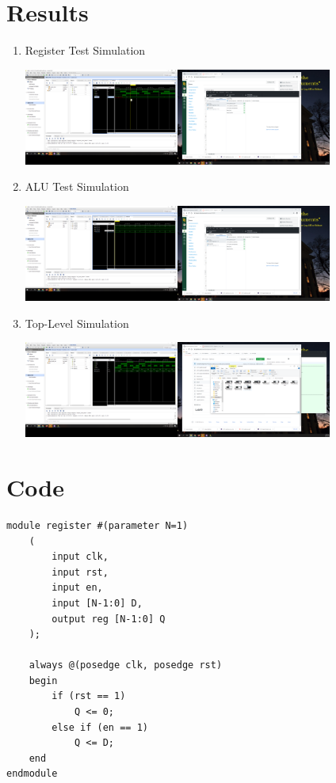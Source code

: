 \documentclass[11pt]{article}
\begin{document}
\section*{Results}
\begin{enumerate}
	
\item Register Test Simulation

\includegraphics[width=0.8\textwidth, trim= 28.5cm 16cm 68cm 5.5cm, clip]{register_test.PNG}
\label{fig:Register Test Simulation}

\item ALU Test Simulation 

\includegraphics[width=0.8\textwidth, trim= 28.5cm 16cm 68cm 5.5cm, clip]{alu_test.PNG}
\label{fig:ALU Test Simulation}


\item Top-Level Simulation 

\includegraphics[width=0.8\textwidth, trim= 28.5cm 16cm 68cm 5.5cm, clip]{top_level_test.PNG}
\label{fig:Top-Level Simulation }

\end{enumerate}

\section*{Code}

\begin{lstlisting}[style=Verilog,caption=register ,label=register.sv]
module register #(parameter N=1)
	(
		input clk,
		input rst,
		input en,
		input [N-1:0] D,
		output reg [N-1:0] Q
	);

	always @(posedge clk, posedge rst)
	begin 
		if (rst == 1)
			Q <= 0;
		else if (en == 1)
			Q <= D;
	end 
endmodule
\end{lstlisting}
\end{document}
